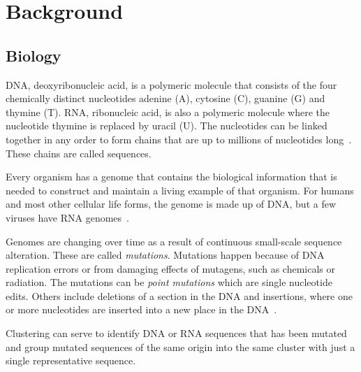 \section{Background}

\subsection{Biology}

DNA, deoxyribonucleic acid, is a polymeric molecule that consists of the four
chemically distinct nucleotides adenine (A), cytosine (C), guanine (G) and
thymine (T). RNA, ribonucleic acid, is also a polymeric molecule where the
nucleotide thymine is replaced by uracil (U).  The nucleotides can be linked
together in any order to form chains that are up to millions of nucleotides
long~\cite[pp.~8-9]{brown}. These chains are called sequences.

Every organism has a genome that contains the biological information that is
needed to construct and maintain a living example of that organism. For humans
and most other cellular life forms, the genome is made up of DNA, but a few
viruses have RNA genomes~\cite[pp. 3-4]{brown}.

Genomes are changing over time as a result of continuous small-scale sequence
alteration. These are called \textit{mutations}. Mutations happen because of
DNA replication errors or from damaging effects of mutagens, such as chemicals
or radiation. The mutations can be \textit{point mutations} which are single
nucleotide edits. Others include deletions of a section in the DNA and
insertions, where one or more nucleotides are inserted into a new place in the
DNA~\cite[pp. 505-506]{brown}.

Clustering can serve to identify DNA or RNA sequences that has been mutated and
group mutated sequences of the same origin into the same cluster with just a
single representative sequence.

